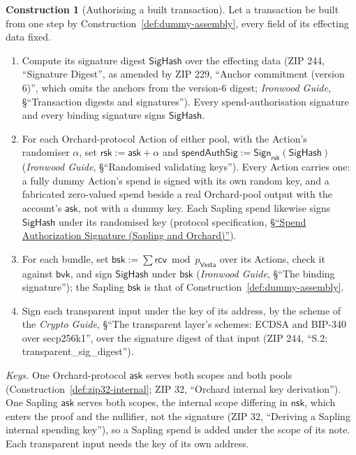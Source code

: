 \documentclass[11pt,a4paper]{article}
\theoremstyle{definition}
\newtheorem{construction}[theorem]{Construction}
\newcommand{\Vesta}{\ensuremath{\mathsf{Vesta}}}
\newcommand{\ask}{\ensuremath{\mathsf{ask}}}
\newcommand{\rcv}{\ensuremath{\mathsf{rcv}}}
\newcommand{\rsk}{\ensuremath{\mathsf{rsk}}}
\begin{document}
\begin{construction}[Authorising a built transaction]\label{def:authorise}
Let a transaction be built from one step by
Construction~\ref{def:dummy-assembly}, every field of its effecting data
fixed.
\begin{enumerate}[label=(\arabic*)]
\item Compute its signature digest $\mathsf{SigHash}$ over the effecting
  data (ZIP 244, ``Signature Digest'', as amended by ZIP 229, ``Anchor
  commitment (version 6)'', which omits the anchors from the version-$6$
  digest; \emph{Ironwood Guide}, \S``Transaction digests and signatures'').
  Every spend-authorisation signature and every binding signature signs
  $\mathsf{SigHash}$.
\item For each Orchard-protocol Action of either pool, with the Action's
  randomiser $\alpha$, set $\rsk := \ask + \alpha$ and
  $\mathsf{spendAuthSig} := \mathsf{Sign}_{\rsk}(\mathsf{SigHash})$
  (\emph{Ironwood Guide}, \S``Randomised validating keys''). Every Action
  carries one: a fully dummy Action's spend is signed with its own random
  key, and a fabricated zero-valued spend beside a real Orchard-pool output
  with the account's $\ask$, not with a dummy key. Each Sapling spend
  likewise signs $\mathsf{SigHash}$ under its randomised key (protocol
  specification,
  \href{https://zips.z.cash/protocol/protocol.pdf\#spendauthsig}%
  {\S``Spend Authorization Signature (Sapling and Orchard)''}).
\item For each bundle, set $\mathsf{bsk} := \sum \rcv \bmod p_{\Vesta}$ over
  its Actions, check it against $\mathsf{bvk}$, and sign $\mathsf{SigHash}$
  under $\mathsf{bsk}$ (\emph{Ironwood Guide}, \S``The binding
  signature''); the Sapling $\mathsf{bsk}$ is that of
  Construction~\ref{def:dummy-assembly}.
\item Sign each transparent input under the key of its address, by the
  scheme of the \emph{Crypto Guide}, \S``The transparent layer's schemes:
  ECDSA and BIP-340 over secp256k1'', over the signature digest of that
  input (ZIP 244, ``S.2: transparent\_sig\_digest'').
\end{enumerate}
\emph{Keys.} One Orchard-protocol $\ask$ serves both scopes and both pools
(Construction~\ref{def:zip32-internal}; ZIP 32, ``Orchard internal key
derivation''). One Sapling $\ask$ serves both scopes, the internal scope
differing in $\mathsf{nsk}$, which enters the proof and the nullifier, not
the signature (ZIP 32, ``Deriving a Sapling internal spending key''), so a
Sapling spend is added under the scope of its note. Each transparent input
needs the key of its own address.
\end{construction}
\end{document}
